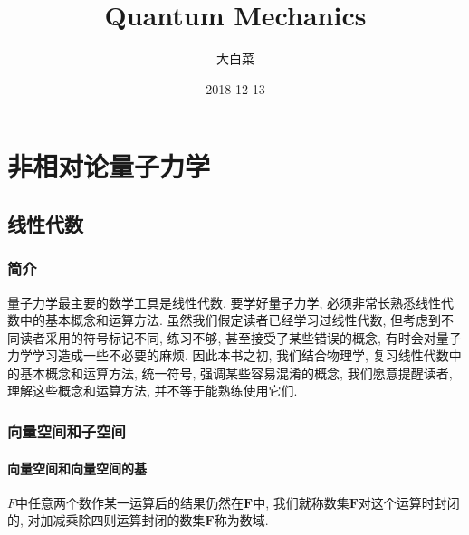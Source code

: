 \documentclass{book}
\begin{document}
\title{Quantum Mechanics}
\author{大白菜}
\date{2018-12-13}
\maketitle
\tableofcontents
\part{非相对论量子力学}
\chapter{线性代数}
\section{简介}
量子力学最主要的数学工具是线性代数. 要学好量子力学, 必须非常长熟悉线性代数中的基本概念和运算方法. 虽然我们假定读者已经学习过线性代数, 但考虑到不同读者采用的符号标记不同, 练习不够, 甚至接受了某些错误的概念, 有时会对量子力学学习造成一些不必要的麻烦. 因此本书之初, 我们结合物理学, 复习线性代数中的基本概念和运算方法, 统一符号, 强调某些容易混淆的概念, 我们愿意提醒读者, 理解这些概念和运算方法, 并不等于能熟练使用它们.
\section{向量空间和子空间}
\subsection*{向量空间和向量空间的基}
$F$中任意两个数作某一运算后的结果仍然在$\mathbf{F}$中, 我们就称数集$\mathbf{F}$对这个运算时封闭的, 对加减乘除四则运算封闭的数集$\mathbf{F}$称为数域.
\end{document}
